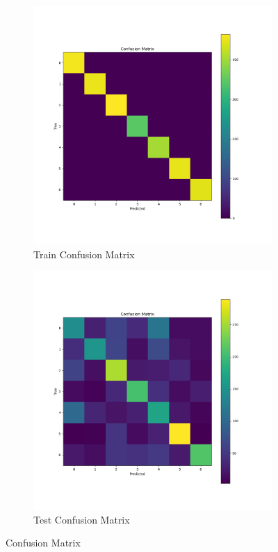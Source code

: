 \documentclass{article}
\begin{document}
        
    
\begin{figure}[h!]
    \centering
    \begin{subfigure}{0.45\textwidth}
        \includegraphics[width=\textwidth]{./pic/confusion_matrix_3041.png}
        \caption{Train Confusion Matrix}
        \label{fig:confusion_matrix_train_aug}
    \end{subfigure}
    \hfill %
    \begin{subfigure}{0.45\textwidth}
        \includegraphics[width=\textwidth]{./pic/confusion_matrix_2723_1.png}
        \caption{Test Confusion Matrix}
        \label{fig:confusion_matrix_test_aug}
    \end{subfigure}
    \caption{Confusion Matrix}
\end{figure}
\end{document}
